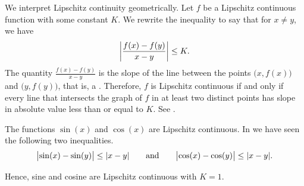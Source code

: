 We interpret Lipschitz continuity geometrically.  Let $f$ be a Lipschitz
continuous function with some constant $K$.  We rewrite the inequality 
to say that for $x \neq y$, we have
\begin{equation*}
\left\lvert {\frac{f(x)-f(y)}{x-y}} \right\rvert \leq K .
\end{equation*}
The quantity $\frac{f(x)-f(y)}{x-y}$ is the slope of the line
between the points $\bigl(x,f(x)\bigr)$
and $\bigl(y,f(y)\bigr)$, that is, a \emph{}.  Therefore, $f$ is Lipschitz
continuous if and only if every line that intersects the graph of $f$ in at least two
distinct
points has slope in absolute value less than or equal to $K$.  See .
\begin{myfigureht}
\caption{The slope of a secant line.
A function is Lipschitz if %
$\abs{\frac{f(x)-f(y)}{x-y}} \leq K$ for all $x$ and $y$.\label{fig:lipschitz}}
\end{myfigureht}

\begin{example}
The functions $\sin(x)$ and $\cos(x)$ are Lipschitz continuous.
In  we have seen the following two inequalities.
\begin{equation*}
\bigl\lvert {\sin(x)-\sin(y)} \bigr\rvert 
\leq \lvert {x-y} \rvert
\qquad \text{and} \qquad
\bigl\lvert {\cos(x)-\cos(y)} \bigr\rvert
\leq \lvert {x-y} \rvert .
\end{equation*}

Hence, sine and cosine are Lipschitz continuous with $K=1$.
\end{example}

